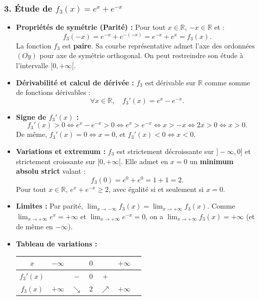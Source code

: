 \documentclass[11pt,a4paper]{article}
\newcommand{\R}{\mathbb{R}}
\begin{document}
\begin{correctionbox}[Exercice 3]
\subsubsection*{3. Étude de $f_3(x) = e^x + e^{-x}$}
\begin{itemize}
    \item \textbf{Propriétés de symétrie (Parité) :}
    Pour tout $x \in \R$, $-x \in \R$ et :
    \[
    f_3(-x) = e^{-x} + e^{-(-x)} = e^{-x} + e^x = f_3(x).
    \]
    La fonction $f_3$ est \textbf{paire}. Sa courbe représentative admet l'axe des ordonnées $(Oy)$ pour axe de symétrie orthogonal. On peut restreindre son étude à l'intervalle $[0, +\infty[$.
    \item \textbf{Dérivabilité et calcul de dérivée :}
    $f_3$ est dérivable sur $\R$ comme somme de fonctions dérivables :
    \[
    \forall x \in \R, \quad f_3'(x) = e^x - e^{-x}.
    \]
    \item \textbf{Signe de $f_3'(x)$ :}
    \[
    f_3'(x) > 0 \iff e^x - e^{-x} > 0 \iff e^x > e^{-x} \iff x > -x \iff 2x > 0 \iff x > 0.
    \]
    De même, $f_3'(x) = 0 \iff x = 0$, et $f_3'(x) < 0 \iff x < 0$.
    \item \textbf{Variations et extremum :}
    $f_3$ est strictement décroissante sur $]-\infty, 0]$ et strictement croissante sur $[0, +\infty[$.
    Elle admet en $x = 0$ un \textbf{minimum absolu strict} valant :
    \[
    f_3(0) = e^0 + e^0 = 1 + 1 = 2.
    \]
    Pour tout $x \in \R$, $e^x + e^{-x} \ge 2$, avec égalité si et seulement si $x = 0$.
    \item \textbf{Limites :}
    Par parité, $\lim_{x \to -\infty} f_3(x) = \lim_{x \to +\infty} f_3(x)$.
    Comme $\lim_{x \to +\infty} e^x = +\infty$ et $\lim_{x \to +\infty} e^{-x} = 0$, on a $\lim_{x \to +\infty} f_3(x) = +\infty$ (et de même en $-\infty$).
    \item \textbf{Tableau de variations :}
    \begin{center}
    \begin{tabular}{|c|lccccr|}
    \hline
    $x$ & $-\infty$ & & $0$ & & $+\infty$ \\
    \hline
    $f_3'(x)$ & & $-$ & $0$ & $+$ & \\
    \hline
    $f_3(x)$ & $+\infty$ & $\searrow$ & $2$ & $\nearrow$ & $+\infty$ \\
    \hline
    \end{tabular}
    \end{center}
\end{itemize}


\end{correctionbox}
\end{document}
